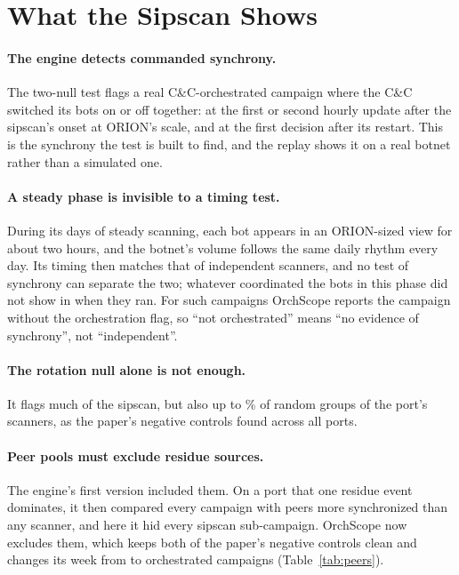 \documentclass[11pt]{article}
\newcommand{\sysname}{OrchScope}
\begin{document}
\begin{table}[t]
\centering
\caption{The paper's week (residue-free peers, the default) and the same week re-tested with
residue sources admitted as peers, on the pipeline's own surrogate draws, with the paper's two
negative controls run with each pool.}
\label{tab:peers}
\small

\end{table}

\section{What the Sipscan Shows}
\label{sec:meaning}

\paragraph{The engine detects commanded synchrony.} The two-null test flags a real
C\&C-orchestrated campaign where the C\&C switched its bots on or off together: at the first or
second hourly update after the sipscan's onset at ORION's scale, and at the first decision after
its restart. This is the
synchrony the test is built to find, and the replay shows it on a real botnet rather than a
simulated one.

\paragraph{A steady phase is invisible to a timing test.} During its \SipSteadyDays{} days of
steady scanning, each bot appears in an ORION-sized view for about two hours, and the botnet's
volume follows the same daily rhythm every day. Its timing then matches that of independent
scanners, and no test of synchrony can separate the two; whatever coordinated the bots in this
phase did not show in when they ran. For such campaigns \sysname{} reports the campaign without
the orchestration flag, so ``not orchestrated'' means ``no evidence of synchrony'', not
``independent''.

\paragraph{The rotation null alone is not enough.} It flags much of the sipscan, but also up to
\SipCtlRotMax\% of random groups of the port's scanners, as the paper's negative controls found
across all ports.

\paragraph{Peer pools must exclude residue sources.} The engine's first version included them. On
a port that one residue event dominates, it then compared every campaign with peers more
synchronized than any scanner, and here it hid every sipscan sub-campaign. \sysname{} now excludes
them, which keeps both of the paper's negative controls clean and changes its week from
\ResPeersOrch{} to \WeekOrch{} orchestrated campaigns (Table~\ref{tab:peers}).
\end{document}
